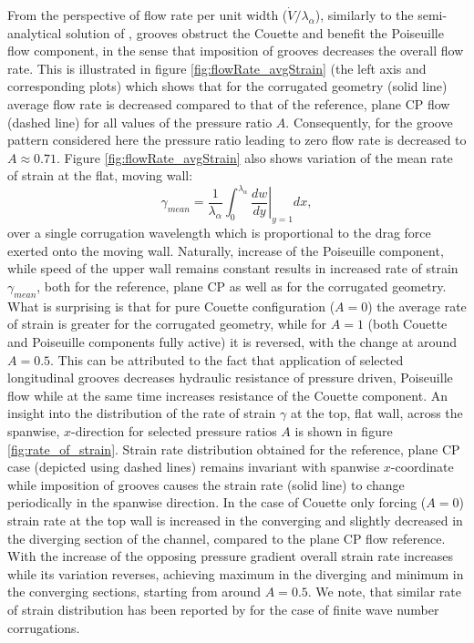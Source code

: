 \documentclass[lineno]{jfm}
\begin{document}
From the perspective of flow rate per unit width ($\Dot{V}/\lambda_\alpha$),
similarly to the semi-analytical solution of \citet{mohammadi2014effects}, grooves obstruct the Couette and benefit the Poiseuille flow component, in the sense that imposition of grooves decreases the overall flow rate.
This is illustrated in figure \ref{fig:flowRate_avgStrain} (the left axis and corresponding plots) which shows that for the corrugated geometry (solid line) average flow rate is decreased compared to that of the reference, plane CP flow (dashed line) for all values of the pressure ratio $A$. Consequently, for the groove pattern considered here the pressure ratio leading to zero flow rate is decreased to $A\approx0.71$.
Figure \ref{fig:flowRate_avgStrain} also shows variation of the mean rate of strain at the flat, moving wall:
\begin{equation}
\gamma_{mean}=\frac{1}{\lambda_\alpha} \int_{0}^{\lambda_\alpha} \left.\frac{dw}{dy}\right\vert_{y=1} dx,
\label{eq:gamma_mean}
\end{equation}
over a single corrugation wavelength which is proportional to the drag force exerted onto the moving wall.
Naturally, increase of the Poiseuille component, while speed of the upper wall remains constant results in increased rate of strain $\gamma_{mean}$, both for the reference, plane CP as well as for the corrugated geometry.
What is surprising is that for pure Couette configuration ($A=0$) the average rate of strain is greater for the corrugated geometry, while for $A=1$ (both Couette and Poiseuille components fully active) it is reversed, with the change at around $A=0.5$.
This can be attributed to the fact that application of selected longitudinal grooves decreases hydraulic resistance of pressure driven, Poiseuille flow while at the same time increases
resistance of the Couette component.
An insight into the distribution of the rate of strain $\gamma$ at the top, flat wall, across the spanwise, $x$-direction for selected pressure ratios $A$ is shown in figure \ref{fig:rate_of_strain}.
Strain rate distribution obtained for the reference, plane CP case (depicted using dashed lines) remains invariant with spanwise $x$-coordinate while imposition of grooves causes the strain rate (solid line) to change periodically in the spanwise direction.
In the case of Couette only forcing ($A=0$) strain rate at the top wall is increased in the converging and slightly decreased in the diverging section of the channel, compared to the plane CP flow reference.
With the increase of the opposing pressure gradient overall strain rate increases while its variation reverses, achieving maximum in the diverging and minimum in the converging sections, starting from around $A=0.5$.
We note, that similar rate of strain distribution has been reported by \citet{mohammadi2014effects} for the case of finite wave number corrugations.
\end{document}
